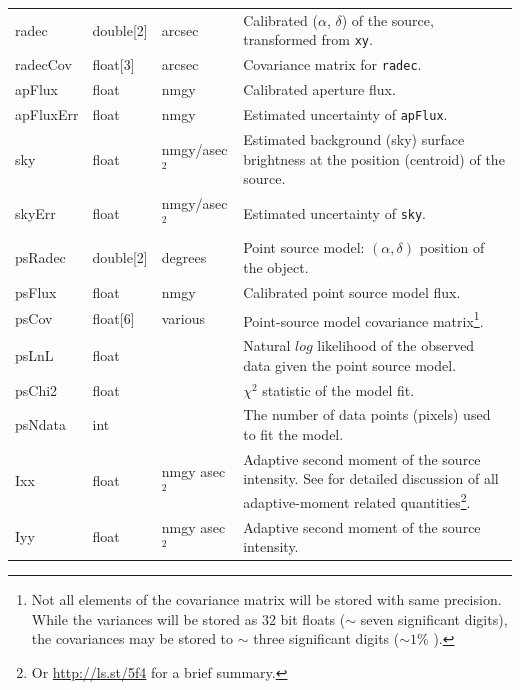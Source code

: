 \documentclass[12pt]{article}
\begin{document}
\begin{center}
\begin{longtable}{p{3cm}p{2cm}p{2cm}p{5cm}}
radec & double[2] & arcsec & Calibrated ($\alpha$, $\delta$) of the source, transformed from \texttt{xy}.\\

radecCov & float[3] & arcsec & Covariance matrix for \texttt{radec}. \\

apFlux & float & nmgy & Calibrated aperture flux. \\

apFluxErr & float & nmgy &  Estimated uncertainty of \texttt{apFlux}. \\

sky & float & nmgy/asec$^{2}$ & Estimated background (sky) surface brightness at the position (centroid) of the source. \\

skyErr & float & nmgy/asec$^{2}$ & Estimated uncertainty of \texttt{sky}. \\

psRadec & double[2] & degrees & Point source model: $(\alpha, \delta)$ position of the object. \\

psFlux & float & nmgy & Calibrated point source model flux.\\

psCov & float[6] & various & Point-source model covariance matrix\footnote{Not all elements of the covariance matrix will be stored with same precision. While the variances will be stored as 32 bit floats ($\sim$ seven significant digits), the covariances may be stored to $\sim$ three significant digits ($\sim 1$\% ).}. \\

psLnL & float & ~ & Natural $log$ likelihood of the observed data given the point source model. \\

psChi2 & float & ~ & $\chi^2$ statistic of the model fit. \\

psNdata & int & ~ & The number of data points (pixels) used to fit the model. \\

Ixx & float & nmgy asec$^{2}$ & Adaptive second moment of the source intensity. See \citet{2002AJ....123..583B} for detailed discussion of all adaptive-moment related quantities\footnote{Or \url{http://ls.st/5f4} for a brief summary.}. \\

Iyy & float & nmgy asec$^{2}$ & Adaptive second moment of the source intensity. \\


\end{longtable}
\end{center}
\end{document}
